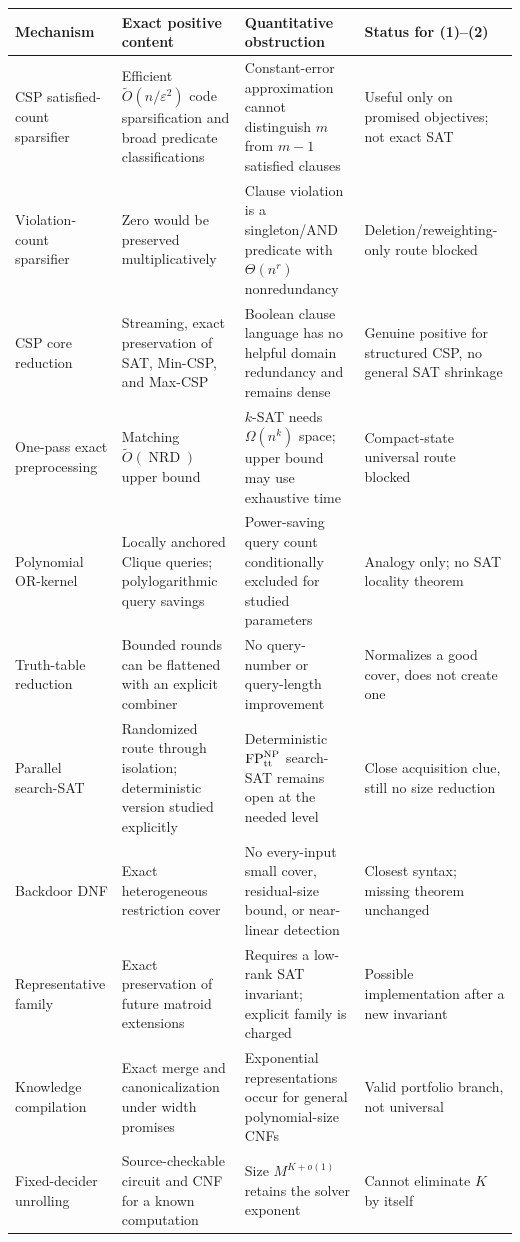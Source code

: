 \documentclass[11pt]{article}
\begin{document}
\renewcommand{\arraystretch}{1.2}
\begin{longtable}{@{}p{}p{}p{}p{}@{}}
\toprule
Mechanism & Exact positive content & Quantitative obstruction & Status for (1)--(2) \\
\midrule
\endhead
CSP satisfied-count sparsifier & Efficient $\widetilde O(n/\varepsilon^2)$ code sparsification and broad predicate classifications & Constant-error approximation cannot distinguish $m$ from $m-1$ satisfied clauses & Useful only on promised objectives; not exact SAT \\
Violation-count sparsifier & Zero would be preserved multiplicatively & Clause violation is a singleton/AND predicate with $\Theta(n^r)$ nonredundancy & Deletion/reweighting-only route blocked \\
CSP core reduction & Streaming, exact preservation of SAT, Min-CSP, and Max-CSP & Boolean clause language has no helpful domain redundancy and remains dense & Genuine positive for structured CSP, no general SAT shrinkage \\
One-pass exact preprocessing & Matching $\widetilde O(\operatorname{NRD})$ upper bound & $k$-SAT needs $\Omega(n^k)$ space; upper bound may use exhaustive time & Compact-state universal route blocked \\
Polynomial OR-kernel & Locally anchored Clique queries; polylogarithmic query savings & Power-saving query count conditionally excluded for studied parameters & Analogy only; no SAT locality theorem \\
Truth-table reduction & Bounded rounds can be flattened with an explicit combiner & No query-number or query-length improvement & Normalizes a good cover, does not create one \\
Parallel search-SAT & Randomized route through isolation; deterministic version studied explicitly & Deterministic $\mathrm{FP}^{\mathrm{NP}}_{\rm tt}$ search-SAT remains open at the needed level & Close acquisition clue, still no size reduction \\
Backdoor DNF & Exact heterogeneous restriction cover & No every-input small cover, residual-size bound, or near-linear detection & Closest syntax; missing theorem unchanged \\
Representative family & Exact preservation of future matroid extensions & Requires a low-rank SAT invariant; explicit family is charged & Possible implementation after a new invariant \\
Knowledge compilation & Exact merge and canonicalization under width promises & Exponential representations occur for general polynomial-size CNFs & Valid portfolio branch, not universal \\
Fixed-decider unrolling & Source-checkable circuit and CNF for a known computation & Size $M^{K+o(1)}$ retains the solver exponent & Cannot eliminate $K$ by itself \\
\bottomrule
\end{longtable}
\end{document}
